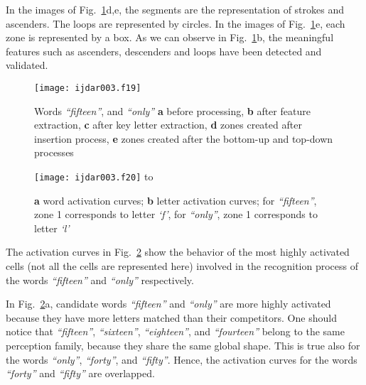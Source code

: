 \documentclass[ijdar]{svjour}
\begin{document}
In the images of Fig.~\ref{EXOUTPUT1}d,e, the segments are the
representation of strokes and ascenders.
The loops are represented by circles.
In the images of Fig.~\ref{EXOUTPUT1}e, each zone is represented by a box.
As we can observe in Fig.~\ref{EXOUTPUT1}b, the meaningful features such as ascenders, descenders and loops have been detected and validated.


\begin{figure}%
\texttt{[image: ijdar003.f19]}%
\caption{Words {\it ``fifteen''}, and {\it ``only''} {\bf a} before
processing, {\bf b} after feature extraction, {\bf c} after key letter
extraction,
{\bf d} zones created after insertion process, {\bf e} zones created
after the bottom-up and top-down processes}
\label{EXOUTPUT1}
\end{figure}%
%
\begin{figure}%
\texttt{[image: ijdar003.f20]}%
\vspace*{-5mm}
\hbox to
\vspace*{-0.5mm}
\caption{\textbf{a} word activation curves; \textbf{b} letter
activation curves; for
{\it ``fifteen''}, zone 1 corresponds to letter {\it `f'}, for {\it
``only''}, zone 1 corresponds to letter {\it `l'}}
\label{FIGACTCURVES}
\end{figure}

The activation curves in Fig.~\ref{FIGACTCURVES} show the behavior of the most highly activated cells (not all the cells are represented here) involved in the recognition process of the words {\it ``fifteen''} and {\it ``only''} respectively.


In Fig.~\ref{FIGACTCURVES}a, candidate words {\it ``fifteen''} and {\it ``only''} are more highly activated because they have more letters matched than their competitors.
One should notice that {\it ``fifteen''}, {\it ``sixteen''}, {\it
``eighteen''}, and {\it ``fourteen''} belong to the same perception family, because they share the same global shape.
This is true also for the words {\it ``only''}, {\it ``forty''}, and
{\it ``fifty''}.
Hence, the activation curves for the words {\it ``forty''} and {\it ``fifty''} are overlapped.
\end{document}
